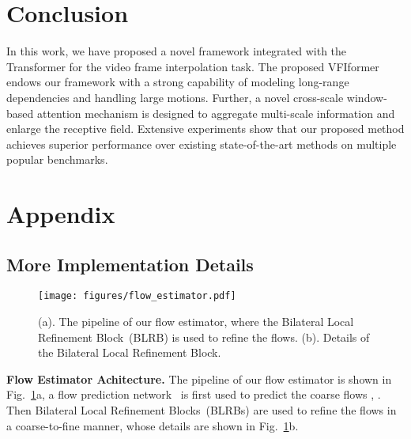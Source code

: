 \documentclass[10pt,twocolumn,letterpaper]{article}
\begin{document}
	
	\section{Conclusion}
	
	In this work, we have proposed a novel framework integrated with the Transformer for the video frame interpolation task. The proposed VFIformer endows our framework with a strong capability of modeling long-range dependencies and handling large motions. Further, a novel cross-scale window-based attention mechanism is designed to aggregate multi-scale information and enlarge the receptive field. Extensive experiments show that our proposed method achieves superior performance over existing state-of-the-art methods on multiple popular benchmarks. 
	
	
	
	
	
{\small
		
		
	}


\clearpage
	\newpage
	
	\appendix
	
	\section{Appendix}
	
	\subsection{More Implementation Details}
	\label{sec:imp}
	
	
	\begin{figure}[h]
		\begin{center}
\texttt{[image: figures/flow\_estimator.pdf]}
		\end{center}
		\vspace{-0.1in}
		\caption{(a). The pipeline of our flow estimator, where the Bilateral Local Refinement Block~(BLRB) is used to refine the flows. (b). Details of the Bilateral Local Refinement Block.}
		\label{fig:flow_estimator}
\end{figure}
	
	
	\noindent\textbf{Flow Estimator Achitecture.} The pipeline of our flow estimator is shown in Fig.~\ref{fig:flow_estimator}a, a flow prediction network~\cite{rife} is first used to predict the coarse flows , . Then Bilateral Local Refinement Blocks~(BLRBs) are used to refine the flows in a coarse-to-fine manner, whose details are shown in Fig.~\ref{fig:flow_estimator}b.
	
\end{document}
